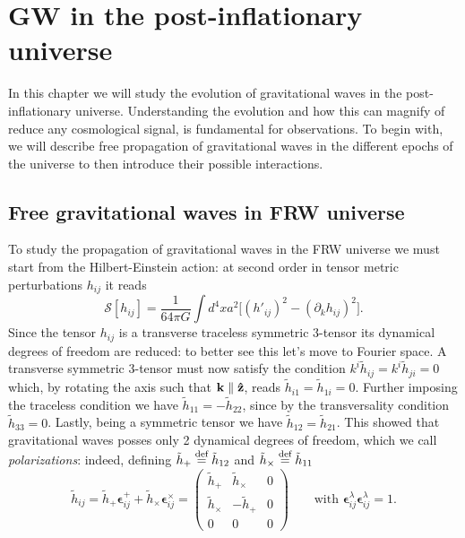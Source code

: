 \chapter{GW in the post-inflationary universe}
\label{chap:GW}
In this chapter we will study the evolution of gravitational waves in the post-inflationary universe. Understanding the evolution and how this can magnify of reduce any cosmological signal, is fundamental for observations. To begin with, we will describe free propagation of gravitational waves in the different epochs of the universe to then introduce their possible interactions. 

\section{Free gravitational waves in FRW universe}
\label{sec:free_GW}
To study the propagation of gravitational waves in the FRW universe we must start from the Hilbert-Einstein action: at second order in tensor metric perturbations $h_{ij}$ it reads
\begin{equation*}
    \mathcal{S} [h_{ij}]=\frac{1}{64\pi G}\int d^4xa^2\Big[(h'_{ij})^2-(\partial_k h_{ij})^2\Big].
\end{equation*}
Since the tensor $h_{ij}$ is a transverse traceless symmetric 3-tensor its dynamical degrees of freedom are reduced: to better see this let's move to Fourier space. A transverse symmetric 3-tensor must now satisfy the condition $k^i\tilde h_{ij}=k^i \tilde h_{ji}=0$ which, by rotating the axis such that $\mathbf k\parallel\mathbf{\hat{z}}$, reads $\tilde{h}_{i1}=\tilde{h}_{1i}=0$. Further imposing the traceless condition we have $\tilde{h}_{11}=-\tilde h_{22}$, since by the transversality condition $\tilde{h}_{33}=0$. Lastly, being a symmetric tensor we have $\tilde{h}_{12}=\tilde{h}_{21}$. This showed that gravitational waves posses only 2 dynamical degrees of freedom, which we call \emph{polarizations}: indeed, defining $\tilde{h}_+\stackrel{\text{def}}{=}\tilde{h}_{12}$ and $ \tilde{h}_\times\stackrel{\text{def}}{=}\tilde{h}_{11}$
\begin{equation}
    \tilde{h}_{ij}=\tilde{h}_+\boldsymbol{\epsilon}_{ij}^++\tilde{h}_{\times}\boldsymbol{\epsilon}_{ij}^\times=
    \begin{pmatrix}
\tilde h_+ & \tilde h_\times & 0  \\ 
\tilde h_\times & -\tilde h_+ & 0  \\
0&0&0
    \end{pmatrix}\qquad\text{with }\boldsymbol{\epsilon}^\lambda_{ij}\boldsymbol{\epsilon}^{\lambda}_{ij}=1.
    \label{eq:GW-polarizations}
\end{equation}
